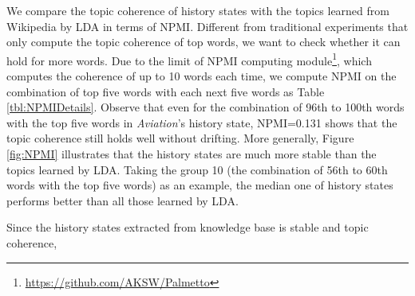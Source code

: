 \documentclass{article}
\begin{document}
We compare the topic coherence of history states with the topics learned from Wikipedia by LDA in terms of NPMI\cite{Rder2015ExploringTS}.
Different from traditional experiments that only compute the topic coherence of top words, we want to check whether  it can hold for more words.
Due to the limit of NPMI computing module\footnote{\url{https://github.com/AKSW/Palmetto}}, which computes the coherence of up to 10 words each time, we compute NPMI on the combination of top five words with each next five words as Table \ref{tbl:NPMIDetails}.
Observe that even for the combination of 96th to 100th words with the top five words in \textit{Aviation}'s history state, NPMI=0.131 shows that the topic coherence still holds well without drifting.
More generally, Figure \ref{fig:NPMI} illustrates that the history states are much more stable than the topics learned by LDA.
Taking the group 10 (the combination of 56th to 60th words with the top five words) as an example, the median one of history states performs better than all those learned by LDA. 

Since the history states extracted from knowledge base is stable and topic coherence, 



\end{document}
